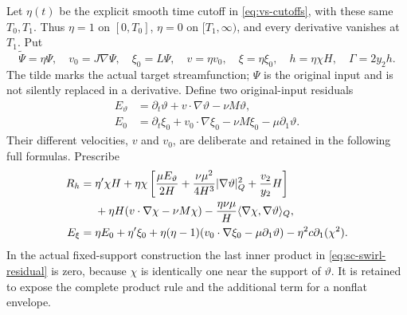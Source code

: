 Let $\eta(t)$ be the explicit smooth time cutoff in
\eqref{eq:vs-cutoffs}, with these same $T_0,T_1$. Thus $\eta=1$
on $[0,T_0]$, $\eta=0$ on $[T_1,\infty)$, and every derivative
vanishes at $T_1$. Put
\begin{equation}\label{eq:sc-compact-fields}
 \widetilde\Psi=\eta\Psi,\quad
 v_0=J\nabla\Psi,\quad \xi_0=L\Psi,\quad
 v=\eta v_0,\quad\xi=\eta\xi_0,\quad
 h=\eta\chi H,\quad\Gamma=2y_2h.
\end{equation}
The tilde marks the actual target streamfunction; $\Psi$ is the
original input and is not silently replaced in a derivative.
Define two original-input residuals
\begin{align}
 E_\vartheta&=\partial_t\vartheta+v\cdot\nabla\vartheta-\nu M\vartheta,
 \label{eq:sc-input-scalar}\\
 E_0&=\partial_t\xi_0+v_0\cdot\nabla\xi_0-\nu M\xi_0
                   -\mu\partial_1\vartheta.
 \label{eq:sc-input-vorticity}
\end{align}
Their different velocities, $v$ and $v_0$, are deliberate and retained
in the following full formulas. Prescribe
\begin{align}
 R_h={}&\eta'\chi H
 +\eta\chi\left[
       \frac{\mu E_\vartheta}{2H}
       +\frac{\nu\mu^2}{4H^3}|\nabla\vartheta|_Q^2
       +\frac{v_2}{y_2}H\right]\notag\\
 &+\eta H(v\cdot\nabla\chi-\nu M\chi)
       -\frac{\eta\nu\mu}{H}
                    \langle\nabla\chi,\nabla\vartheta\rangle_Q,
 \label{eq:sc-swirl-residual}\\
 E_\xi={}&\eta E_0+\eta'\xi_0
 +\eta(\eta-1)
           (v_0\cdot\nabla\xi_0-\mu\partial_1\vartheta)
       -\eta^2c\partial_1(\chi^2).
 \label{eq:sc-vorticity-residual}
\end{align}
In the actual fixed-support construction the last inner product in
\eqref{eq:sc-swirl-residual} is zero, because $\chi$ is identically
one near the support of $\vartheta$. It is retained to expose the
complete product rule and the additional term for a nonflat envelope.

